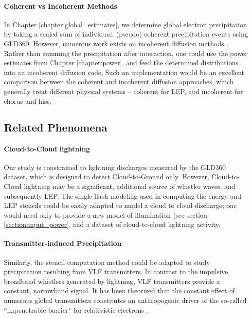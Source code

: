 \paragraph{Coherent vs Incoherent Methods}
In Chapter \ref{chapter:global_estimates}, we determine global electron precipitation by taking a scaled sum of individual, (pseudo) coherent precipitation events using GLD360. However, numerous work exists on incoherent diffusion methods \citep{Kennel1966, Lyons1973, Glauert2005}. Rather than summing the precipitation after interaction, one could use the power estimates from Chapter \ref{chapter:power}, and feed the determined distributions into an incoherent diffusion code. Such an implementation would be an excellent comparison between the coherent and incoherent diffusion approaches, which generally treat different physical systems -- coherent for LEP, and incoherent for chorus and hiss.

\subsection{Related Phenomena}
\paragraph{Cloud-to-Cloud lightning}
Our study is constrained to lightning discharges measured by the GLD360 dataset, which is designed to detect Cloud-to-Ground only. However, Cloud-to-Cloud lightning may be a significant, additional source of whistler waves, and subsequently LEP. The single-flash modeling used in computing the energy and LEP stencils could be easily adapted to model a cloud to cloud discharge; one would need only to provide a new model of illumination (see section \ref{section:input_power}, and a dataset of cloud-to-cloud lightning activity. 
\paragraph{Transmitter-induced Precipitation}
Similarly, the stencil computation method could be adapted to study precipitation resulting from VLF transmitters. In contrast to the impulsive, broadband whistlers generated by lightning, VLF transmitters provide a constant, narrowband signal. It has been theorized that the constant effect of numerous global transmitters constitutes an anthropogenic driver of the so-called ``impenetrable barrier'' for relativistic electrons \citep{Baker2014, Foster2016}.



